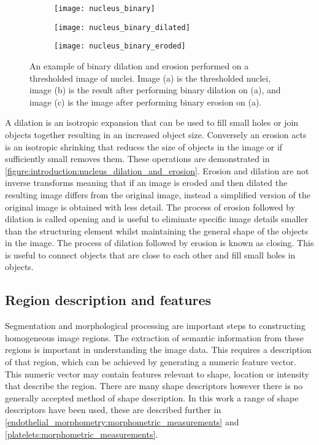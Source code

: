 \begin{figure}[htbp!]\centering
	\begin{subfigure}[b]{0.32\linewidth}
		\centering
		\texttt{[image: nucleus\_binary]}
		\caption{}
		\label{figure:introduction:nucleus_binary}
	\end{subfigure}
	\begin{subfigure}[b]{0.32\linewidth}
		\centering
		\texttt{[image: nucleus\_binary\_dilated]}
		\caption{}
		\label{figure:introduction:nucleus_dilated}
	\end{subfigure}
	\begin{subfigure}[b]{0.32\linewidth}
		\centering
		\texttt{[image: nucleus\_binary\_eroded]}
		\caption{}
		\label{figure:introduction:nucleus_erosion}
	\end{subfigure}
\caption[Binary dilation and erosion]{An example of binary dilation and erosion performed on a thresholded image of nuclei. Image (a) is the thresholded nuclei, image (b) is the result after performing binary dilation on (a), and image (c) is the image after performing binary erosion on (a).}
\label{figure:introduction:nucleus_dilation_and_erosion}
\end{figure}

A dilation is an isotropic expansion that can be used to fill small holes or join objects together resulting in an increased object size. Conversely an erosion acts is an isotropic shrinking that reduces the size of objects in the image or if sufficiently small removes them. These operations are demonstrated in \autoref{figure:introduction:nucleus_dilation_and_erosion}. Erosion and dilation are not inverse transforms meaning that if an image is eroded and then dilated the resulting image differs from the original image, instead a simplified version of the original image is obtained with less detail. The process of erosion followed by dilation is called opening and is useful to eliminate specific image details smaller than the structuring element whilst maintaining the general shape of the objects in the image. The process of dilation followed by erosion is known as closing. This is useful to connect objects that are close to each other and fill small holes in objects.

\subsection{Region description and features}
\label{introduction:image_processing:morphological_processing}
Segmentation and morphological processing are important steps to constructing homogeneous image regions. The extraction of semantic information from these regions is important in understanding the image data. This requires a description of that region, which can be achieved by generating a numeric feature vector. This numeric vector may contain features relevant to shape, location or intensity that describe the region. There are many shape descriptors however there is no generally accepted method of shape description. In this work a range of shape descriptors have been used, these are described further in \autoref{endothelial_morphometry:morphometric_measurements} and \autoref{platelets:morphometric_measurements}.

